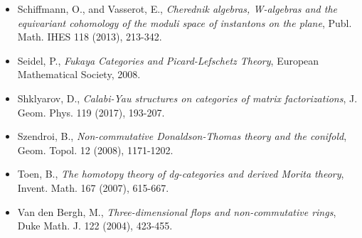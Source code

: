 \documentclass[11pt]{amsart}
\begin{document}
\begin{itemize}
Duke Math. J. 161 (2012), 1863-1926.
\item Schiffmann, O., and Vasserot, E., \emph{Cherednik algebras,
W-algebras and the equivariant cohomology of the moduli space of
instantons on the plane}, Publ. Math. IHES 118 (2013), 213-342.
\item Seidel, P., \emph{Fukaya Categories and Picard-Lefschetz Theory},
European Mathematical Society, 2008.
\item Shklyarov, D., \emph{Calabi-Yau structures on categories of matrix
factorizations}, J. Geom. Phys. 119 (2017), 193-207.
\item Szendroi, B., \emph{Non-commutative Donaldson-Thomas theory and the
conifold}, Geom. Topol. 12 (2008), 1171-1202.
\item Toen, B., \emph{The homotopy theory of dg-categories and derived
Morita theory}, Invent. Math. 167 (2007), 615-667.
\item Van den Bergh, M., \emph{Three-dimensional flops and
non-commutative rings}, Duke Math. J. 122 (2004), 423-455.
\end{itemize}
\end{document}
